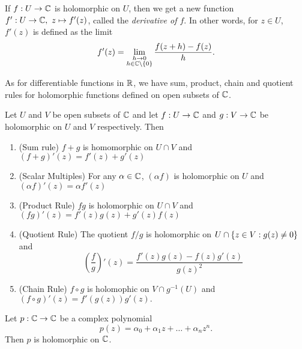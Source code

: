 If $f:U \to \mathbb{C}$ is holomorphic on $U$, then we get a new function $f':U \to \mathbb{C}, \ z \mapsto f'(z)$, called the \emph{derivative of $f$}.  In other words, for $z \in U$, $f'(z)$ is defined as the limit
\[
f'(z) = \lim_{\substack{h \to 0 \\ h \in \mathbb{C} \backslash \left\{0\right\}}} \frac{f(z+h)-f(z)}{h}.
\]



As for differentiable functions in $\mathbb{R}$, we have sum, product, chain and quotient rules for holomorphic functions defined on open subsets of $\mathbb{C}$.

\begin{theorem}
\label{t:diffrules}
Let $U$ and $V$ be open subsets of $\mathbb{C}$ and let $f:U \to \mathbb{C}$ and $g:V \to \mathbb{C}$ be holomorphic on $U$ and $V$ respectively.  Then
\begin{enumerate}
\item (Sum rule) $f+g$ is homomorphic on $U \cap V$ and $(f+g)'(z)=f'(z)+g'(z)$
\item (Scalar Multiples) For any $\alpha \in \mathbb{C}$, $(\alpha f )$ is holomorphic on $U$ and $(\alpha f)' (z) = \alpha f'(z)$
\item (Product Rule) $fg$ is holomorphic on $U \cap V$ and $(fg)'(z)=f'(z)g(z)+g'(z)f(z)$
\item (Quotient Rule) The quotient $f/g$ is holomorphic on $U \cap \left\{ z \in V: g(z) \neq 0\right\}$ and 
\[
\left( \frac{f}{g} \right) '(z) = \frac{f'(z)g(z)-f(z)g'(z)}{g(z)^2}
\]
\item (Chain Rule) $f \circ g$ is holomophic on $V \cap g^{-1}(U)$ and $(f\circ g)'(z) = f'(g(z))g'(z).$
\end{enumerate}
\end{theorem}

\begin{comment}
Since we only ever speak of a function being holomorphic on an \emph{open} subset $U \subseteq \C$, the statement of Theorem~\ref{t:diffrules} implicitly relies on the assumption that $U \cap V$, $U \cap \set{ z \in V: g(z) \neq 0 }$ and $V \cap g^{-1} (U)$ are all open whenever $U$ and $V$ are open and $f$ and $g$ are holomorphic.  These are all relatively easy to prove (the second and third rely on Proposition~\ref{p:diffimpliescontinuous}).

The proof of Theorem~\ref{t:diffrules} is very similar to that of the corresponding result for functions of a real variable, and is thus omitted.
\end{comment}
\begin{example}
 Let $p:\mathbb{C} \to \mathbb{C}$ be a complex polynomial
\[
p(z) = \alpha_0 + \alpha_1z + \ldots + \alpha_n z^n.
\]
Then $p$ is holomorphic on $\mathbb{C}$.
\end{example}

